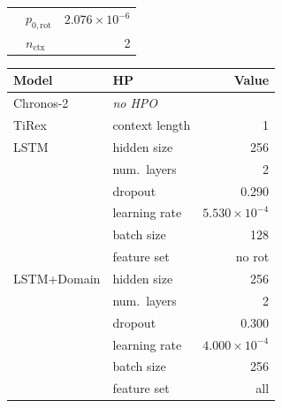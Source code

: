 \begin{table}[t]
\begin{minipage}[t]{0.49\textwidth}
\begin{tabular}{llr}
               & $p_{0,\text{rot}}$                 & $2.076{\times}10^{-6}$ \\
               & $n_\text{ctx}$                     & 2 \\
\bottomrule
\end{tabular}
\end{minipage}
\begin{minipage}[t]{0.40\textwidth}
\centering
\begin{tabular}{llr}
\toprule
\textbf{Model} & \textbf{HP} & \textbf{Value} \\
\midrule
Chronos-2      & \multicolumn{2}{l}{\textit{no HPO}} \\
TiRex          & context length          & 1 \\
\midrule
LSTM           & hidden size             & 256 \\
               & num.\ layers            & 2 \\
               & dropout                 & 0.290 \\
               & learning rate           & $5.530{\times}10^{-4}$ \\
               & batch size              & 128 \\
               & \cellcolor{orange!15}feature set & \cellcolor{orange!15}no rot \\
\midrule
LSTM+Domain    & hidden size             & 256 \\
               & num.\ layers            & 2 \\
               & dropout                 & 0.300 \\
               & learning rate           & $4.000{\times}10^{-4}$ \\
               & batch size              & 256 \\
               & feature set             & all \\
\bottomrule
\end{tabular}
\end{minipage}
\end{table}


